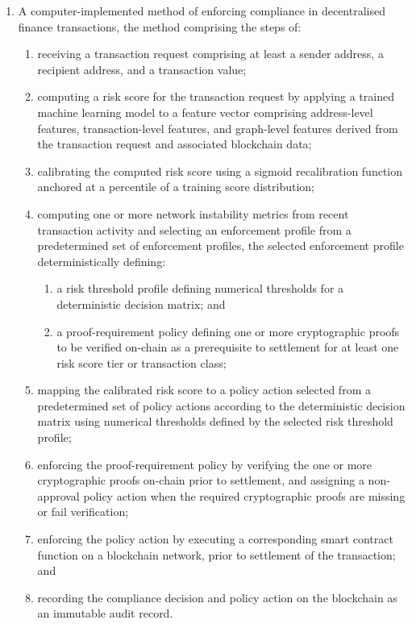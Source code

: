 \documentclass[12pt,a4paper]{article}
\begin{document}
\begin{enumerate}[label=\textbf{\arabic*.}]
\item A computer-implemented method of enforcing compliance in decentralised 
finance transactions, the method comprising the steps of:
\begin{enumerate}[label=(\alph*)]
\item receiving a transaction request comprising at least a sender address, 
a recipient address, and a transaction value;
\item computing a risk score for the transaction request by applying a 
trained machine learning model to a feature vector comprising address-level 
features, transaction-level features, and graph-level features derived from 
the transaction request and associated blockchain data;
\item calibrating the computed risk score using a sigmoid recalibration 
function anchored at a percentile of a training score distribution;
\item computing one or more network instability metrics from recent 
transaction activity and selecting an enforcement profile from a 
predetermined set of enforcement profiles, the selected enforcement profile 
deterministically defining:
\begin{enumerate}[label=(\roman*)]
\item a risk threshold profile defining numerical thresholds for a 
deterministic decision matrix; and
\item a proof-requirement policy defining one or more cryptographic proofs 
to be verified on-chain as a prerequisite to settlement for at least one 
risk score tier or transaction class;
\end{enumerate}
\item mapping the calibrated risk score to a policy action selected from a 
predetermined set of policy actions according to the deterministic decision 
matrix using numerical thresholds defined by the selected risk threshold 
profile;
\item enforcing the proof-requirement policy by verifying the one or more 
cryptographic proofs on-chain prior to settlement, and assigning a non-
approval policy action when the required cryptographic proofs are missing or 
fail verification;
\item enforcing the policy action by executing a corresponding smart 
contract function on a blockchain network, prior to settlement of the 
transaction; and
\item recording the compliance decision and policy action on the blockchain 
as an immutable audit record.
\end{enumerate}


\end{enumerate}
\end{document}
